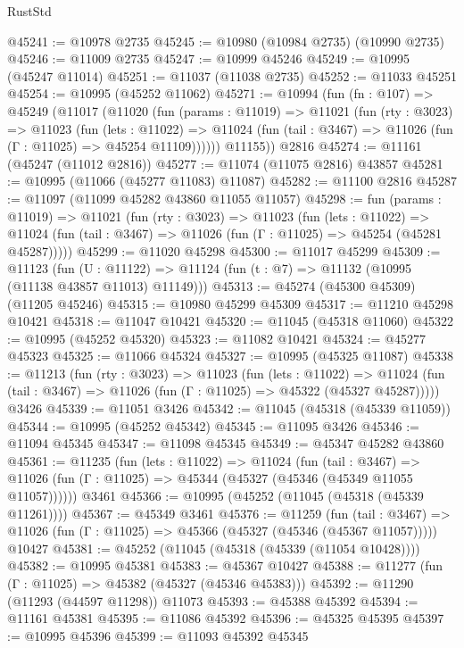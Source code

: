 \begin{lexlean}{RustStd}
\begin{coremodule}
@45241 := @10978 @2735
@45245 := @10980 (@10984 @2735) (@10990 @2735)
@45246 := @11009 @2735
@45247 := @10999 @45246
@45249 := @10995 (@45247 @11014)
@45251 := @11037 (@11038 @2735)
@45252 := @11033 @45251
@45254 := @10995 (@45252 @11062)
@45271 := @10994
    (fun (fn : @107) =>
    @45249
      (@11017
        (@11020
          (fun (params : @11019) =>
          @11021
            (fun (rty : @3023) =>
            @11023
              (fun (lets : @11022) =>
              @11024 (fun (tail : @3467) => @11026 (fun (Γ : @11025) => @45254 @11109))))))
        @11155))
    @2816
@45274 := @11161 (@45247 (@11012 @2816))
@45277 := @11074 (@11075 @2816) @43857
@45281 := @10995 (@11066 (@45277 @11083) @11087)
@45282 := @11100 @2816
@45287 := @11097 (@11099 @45282 @43860 @11055 @11057)
@45298 := fun (params : @11019) =>
  @11021
    (fun (rty : @3023) =>
    @11023
      (fun (lets : @11022) =>
      @11024 (fun (tail : @3467) => @11026 (fun (Γ : @11025) => @45254 (@45281 @45287)))))
@45299 := @11020 @45298
@45300 := @11017 @45299
@45309 := @11123
    (fun (U : @11122) => @11124 (fun (t : @7) => @11132 (@10995 (@11138 @43857 @11013) @11149)))
@45313 := @45274 (@45300 @45309) (@11205 @45246)
@45315 := @10980 @45299 @45309
@45317 := @11210 @45298 @10421
@45318 := @11047 @10421
@45320 := @11045 (@45318 @11060)
@45322 := @10995 (@45252 @45320)
@45323 := @11082 @10421
@45324 := @45277 @45323
@45325 := @11066 @45324
@45327 := @10995 (@45325 @11087)
@45338 := @11213
    (fun (rty : @3023) =>
    @11023
      (fun (lets : @11022) =>
      @11024 (fun (tail : @3467) => @11026 (fun (Γ : @11025) => @45322 (@45327 @45287)))))
    @3426
@45339 := @11051 @3426
@45342 := @11045 (@45318 (@45339 @11059))
@45344 := @10995 (@45252 @45342)
@45345 := @11095 @3426
@45346 := @11094 @45345
@45347 := @11098 @45345
@45349 := @45347 @45282 @43860
@45361 := @11235
    (fun (lets : @11022) =>
    @11024
      (fun (tail : @3467) =>
      @11026 (fun (Γ : @11025) => @45344 (@45327 (@45346 (@45349 @11055 @11057))))))
    @3461
@45366 := @10995 (@45252 (@11045 (@45318 (@45339 @11261))))
@45367 := @45349 @3461
@45376 := @11259
    (fun (tail : @3467) => @11026 (fun (Γ : @11025) => @45366 (@45327 (@45346 (@45367 @11057)))))
    @10427
@45381 := @45252 (@11045 (@45318 (@45339 (@11054 @10428))))
@45382 := @10995 @45381
@45383 := @45367 @10427
@45388 := @11277 (fun (Γ : @11025) => @45382 (@45327 (@45346 @45383)))
@45392 := @11290 (@11293 (@44597 @11298)) @11073
@45393 := @45388 @45392
@45394 := @11161 @45381
@45395 := @11086 @45392
@45396 := @45325 @45395
@45397 := @10995 @45396
@45399 := @11093 @45392 @45345

\end{coremodule}
\end{lexlean}
